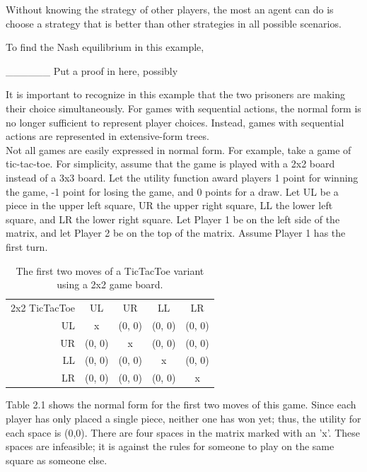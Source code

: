 Without knowing the strategy of other players, the most an agent can do is choose a strategy that is better than other strategies in all possible scenarios. 

To find the Nash equilibrium in this example, 

\_\_\_\_\_\_ Put a proof in here, possibly

It is important to recognize in this example that the two prisoners are making their choice simultaneously. For games with sequential actions, the normal form is no longer sufficient to represent player choices. Instead, games with sequential actions are represented in extensive-form trees.\\

Not all games are easily expressed in normal form. For example, take a game of tic-tac-toe. For simplicity, assume that the game is played with a 2x2 board instead of a 3x3 board. Let the utility function award players 1 point for winning the game, -1 point for losing the game, and 0 points for a draw. Let UL be a piece in the upper left square, UR the upper right square, LL the lower left square, and LR the lower right square. Let Player 1 be on the left side of the matrix, and let Player 2 be on the top of the matrix. Assume Player 1 has the first turn.\\
\begin{table}[h]
  \centering
  \begin{tabular}{r | c | c | c | c |}
    2x2 TicTacToe & UL & UR & LL & LR \\ \cline{2-5}
    UL & x & (0, 0) & (0, 0) & (0, 0) \\ \cline{2-5}
    UR & (0, 0) & x & (0, 0) & (0, 0) \\ \cline{2-5}
    LL & (0, 0) & (0, 0) & x & (0, 0) \\ \cline{2-5}
    LR & (0, 0) & (0, 0) & (0, 0) & x \\ \cline{2-5}
  \end{tabular}
  \caption{The first two moves of a TicTacToe variant using a 2x2 game board.}
\end{table}

Table 2.1 shows the normal form for the first two moves of this game. Since each player has only placed a single piece, neither one has won yet; thus, the utility for each space is (0,0). There are four spaces in the matrix marked with an 'x'. These spaces are infeasible; it is against the rules for someone to play on the same square as someone else.

